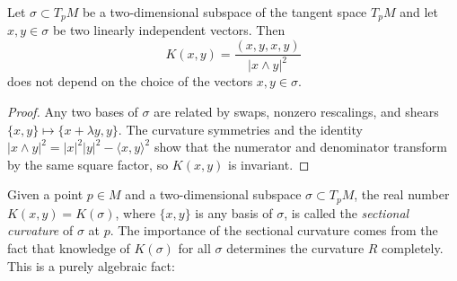 \begin{proposition}
  \label{prop:dc-ch4-3-1}


  Let $\sigma\subset T_pM$ be a two-dimensional subspace of the tangent space
  $T_pM$ and let $x,y\in\sigma$ be two linearly independent vectors. Then
  $$
  K(x,y)=\frac{(x,y,x,y)}{|x\wedge y|^2}
  $$
  does not depend on the choice of the vectors $x,y\in\sigma$.
\end{proposition}
\begin{proof}

  \sketch
  Any two bases of $\sigma$ are related by swaps, nonzero rescalings, and shears
  $\{x,y\}\mapsto\{x+\lambda y,y\}$. The curvature symmetries and the identity
  $|x\wedge y|^2=|x|^2|y|^2-\langle x,y\rangle^2$ show that the numerator and
  denominator transform by the same square factor, so $K(x,y)$ is invariant.
\end{proof}

\begin{definition}
  \label{def:dc-ch4-3-2}


  Given a point $p\in M$ and a two-dimensional subspace $\sigma\subset T_pM$, the
  real number $K(x,y)=K(\sigma)$, where $\{x,y\}$ is any basis of $\sigma$, is
  called the \emph{sectional curvature} of $\sigma$ at $p$.
  The importance of the sectional curvature comes from the fact that knowledge of
  $K(\sigma)$ for all $\sigma$ determines the curvature $R$ completely. This is a
  purely algebraic fact:
\end{definition}

